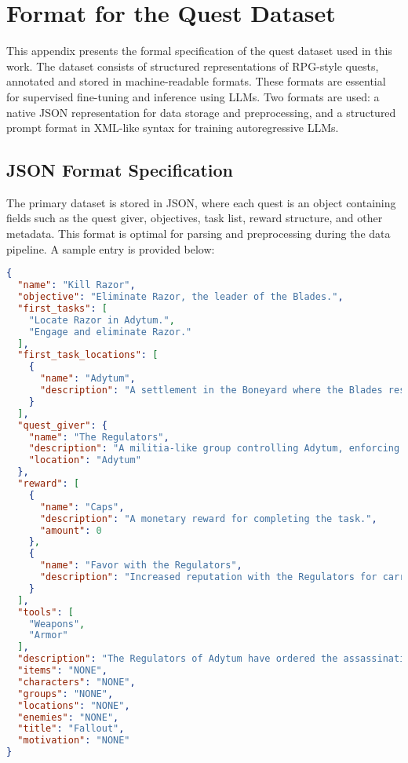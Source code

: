 \chapter{Format for the Quest Dataset}
\label{appendix:quest-dataset}

This appendix presents the formal specification of the quest dataset used in this work. The
dataset consists of structured representations of RPG-style quests, annotated and stored
in machine-readable formats. These formats are essential for supervised fine-tuning and
inference using LLMs. Two formats are used: a native JSON representation for
data storage and preprocessing, and a structured prompt format in XML-like syntax for
training autoregressive LLMs.

\section*{JSON Format Specification}

The primary dataset is stored in JSON, where each quest is an object containing fields
such as the quest giver, objectives, task list, reward structure, and other metadata. This
format is optimal for parsing and preprocessing during the data pipeline. A sample entry is
provided below:

\begin{lstlisting}[language=json, caption={Sample Quest Dataset Format (JSON)}]
{
  "name": "Kill Razor",
  "objective": "Eliminate Razor, the leader of the Blades.",
  "first_tasks": [
    "Locate Razor in Adytum.",
    "Engage and eliminate Razor."
  ],
  "first_task_locations": [
    {
      "name": "Adytum",
      "description": "A settlement in the Boneyard where the Blades reside."
    }
  ],
  "quest_giver": {
    "name": "The Regulators",
    "description": "A militia-like group controlling Adytum, enforcing their own brand of order.",
    "location": "Adytum"
  },
  "reward": [
    {
      "name": "Caps",
      "description": "A monetary reward for completing the task.",
      "amount": 0
    },
    {
      "name": "Favor with the Regulators",
      "description": "Increased reputation with the Regulators for carrying out their orders."
    }
  ],
  "tools": [
    "Weapons",
    "Armor"
  ],
  "description": "The Regulators of Adytum have ordered the assassination of Razor, the leader of the Blades. You must locate and kill her.",
  "items": "NONE",
  "characters": "NONE",
  "groups": "NONE",
  "locations": "NONE",
  "enemies": "NONE",
  "title": "Fallout",
  "motivation": "NONE"
}
\end{lstlisting}

